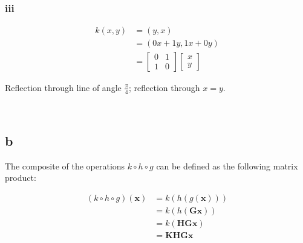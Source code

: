 \documentclass{article}
\newcommand{\blankpage}{
    \newpage
    \
    \newpage
}
\begin{document}
\blankpage
\subsubsection{iii}

\begin{align*}
    k(x, y) &= (y, x) \\
            &= (0x + 1y, 1x + 0y) \\
            &= \begin{bmatrix}
                0 & 1 \\
                1 & 0
               \end{bmatrix}
               \begin{bmatrix}
                   x\\ y
               \end{bmatrix}
\end{align*}

Reflection through line of angle $\frac \pi 4$; reflection through $x=y$.

\blankpage
\subsection{b}

The composite of the operations $k \circ h \circ g$ can be defined as the following matrix product:

\begin{align*}
    (k \circ h \circ g)(\mathbf x) &= k(h(g(\mathbf x))) \\
                                   &= k(h(\mathbf{Gx}))  \\
                                   &= k(\mathbf{HGx})    \\
                                   &= \mathbf{KHGx}
\end{align*}
\end{document}
